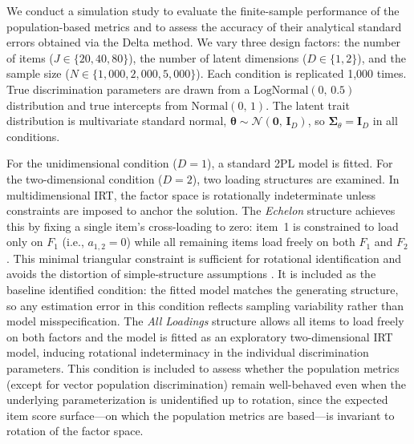 \documentclass[man, 12pt, floatsintext]{apa7}
\begin{document}



We conduct a simulation study to evaluate the finite-sample performance of the population-based metrics and to assess the accuracy of their analytical standard errors obtained via the Delta method. We vary three design factors: the number of items ($J \in \{20, 40, 80\}$), the number of latent dimensions ($D \in \{1, 2\}$), and the sample size ($N \in \{1{,}000, 2{,}000, 5{,}000\}$). Each condition is replicated 1,000 times. True discrimination parameters are drawn from a $\mathrm{LogNormal}(0,\, 0.5)$ distribution and true intercepts from $\mathrm{Normal}(0,\, 1)$. The latent trait distribution is multivariate standard normal, $\boldsymbol{\theta} \sim \mathcal{N}(\mathbf{0},\, \mathbf{I}_D)$, so $\boldsymbol{\Sigma}_\theta = \mathbf{I}_D$ in all conditions.

For the unidimensional condition ($D = 1$), a standard 2PL model is fitted. For the two-dimensional condition ($D = 2$), two loading structures are examined. In multidimensional IRT, the factor space is rotationally indeterminate unless constraints are imposed to anchor the solution. The \emph{Echelon} structure achieves this by fixing a single item's cross-loading to zero: item~1 is constrained to load only on $F_1$ (i.e., $a_{1,2} = 0$) while all remaining items load freely on both $F_1$ and $F_2$. This minimal triangular constraint is sufficient for rotational identification and avoids the distortion of simple-structure assumptions \parencite{Reckase2009}. It is included as the baseline identified condition: the fitted model matches the generating structure, so any estimation error in this condition reflects sampling variability rather than model misspecification. The \emph{All Loadings} structure allows all items to load freely on both factors and the model is fitted as an exploratory two-dimensional IRT model, inducing rotational indeterminacy in the individual discrimination parameters. This condition is included to assess whether the population metrics (except for vector population discrimination) remain well-behaved even when the underlying parameterization is unidentified up to rotation, since the expected item score surface—on which the population metrics are based—is invariant to rotation of the factor space.
\end{document}
